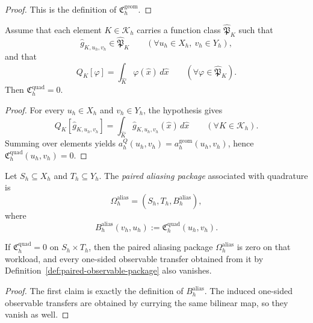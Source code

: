 \begin{proof}
This is the definition of \(\mathfrak C_h^{\mathrm{geom}}\).
\end{proof}

\begin{theorem}
\label{thm:quadrature-exactness-kills-quadrature-crime}
Assume that each element \(K\in\mathcal K_h\) carries a function class
\(\widehat{\mathfrak P}_K\) such that
\[
\widehat g_{K,u_h,v_h}\in \widehat{\mathfrak P}_K
\qquad
(\forall u_h\in X_h,\ v_h\in Y_h),
\]
and that
\[
Q_K[\varphi]=\int_{\widehat K}\varphi(\widehat x)\,d\widehat x
\qquad
(\forall \varphi\in \widehat{\mathfrak P}_K).
\]
Then \(\mathfrak C_h^{\mathrm{quad}}=0\).
\end{theorem}

\begin{proof}
For every \(u_h\in X_h\) and \(v_h\in Y_h\), the hypothesis gives
\[
Q_K[\widehat g_{K,u_h,v_h}]
=
\int_{\widehat K}\widehat g_{K,u_h,v_h}(\widehat x)\,d\widehat x
\qquad
(\forall K\in\mathcal K_h).
\]
Summing over elements yields \(a_h^Q(u_h,v_h)=a_h^{\mathrm{geom}}(u_h,v_h)\),
hence \(\mathfrak C_h^{\mathrm{quad}}(u_h,v_h)=0\).
\end{proof}

\begin{definition}
\label{def:paired-aliasing-package}
Let \(S_h\subseteq X_h\) and \(T_h\subseteq Y_h\). The \emph{paired aliasing
package} associated with quadrature is
\[
\Omega_h^{\mathrm{alias}}=(S_h,T_h,B_h^{\mathrm{alias}}),
\]
where
\[
B_h^{\mathrm{alias}}(v_h,u_h):=\mathfrak C_h^{\mathrm{quad}}(u_h,v_h).
\]
\end{definition}

\begin{corollary}
\label{cor:quadrature-exactness-kills-aliasing}
If \(\mathfrak C_h^{\mathrm{quad}}=0\) on \(S_h\times T_h\), then the paired
aliasing package \(\Omega_h^{\mathrm{alias}}\) is zero on that workload, and
every one-sided observable transfer obtained from it by
Definition~\ref{def:paired-observable-package} also vanishes.
\end{corollary}

\begin{proof}
The first claim is exactly the definition of
\(B_h^{\mathrm{alias}}\). The induced one-sided observable transfers are
obtained by currying the same bilinear map, so they vanish as well.
\end{proof}

